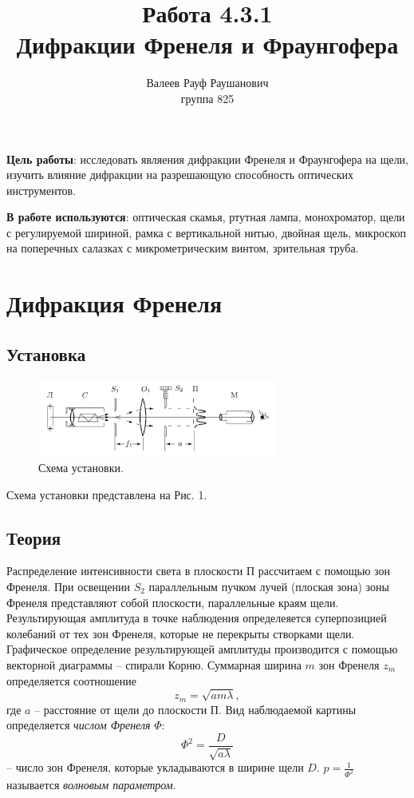 \documentclass[a4paper, 12pt]{article}%
\author{Валеев Рауф Раушанович \\
группа 825}
\date{}
\title{\textbf{Работа 4.3.1\\Дифракции Френеля и Фраунгофера}}
\begin{document}
\maketitle
\textbf{Цель работы}: исследовать являения дифракции Френеля и Фраунгофера на щели, изучить влияние дифракции на разрешающую способность оптических инструментов.


\textbf{В работе используются}: оптическая скамья, ртутная лампа, монохроматор, щели с регулируемой шириной, рамка с вертикальной нитью, двойная щель, микроскоп на поперечных салазках с микрометрическим винтом, зрительная труба.
\section{Дифракция Френеля}
\subsection*{Установка}
\begin{figure}[h]
\includegraphics[width=0.7\textwidth]{7.jpg}
\centering
\caption{Схема установки.}
\end{figure}
Схема установки представлена на Рис. 1.\\
\subsection*{Теория}
Распределение интенсивности света в плоскости П рассчитаем с помощью зон Френеля. При освещении $S_2$ параллельным пучком лучей (плоская зона) зоны Френеля представляют собой плоскости, параллельные краям щели. Результирующая амплитуда в точке наблюдения определеяется суперпозицией колебаний от тех зон Френеля, которые не перекрыты створками щели. Графическое определение результирующей амплитуды производится с помощью векторной диаграммы -- спирали Корню. Суммарная ширина $m$ зон Френеля $z_m$ определяется соотношение
\begin{equation}
z_m = \sqrt{am\lambda},
\end{equation}
где $a$ -- расстояние от щели до плоскости П. Вид наблюдаемой картины определяется \textit{числом Френеля} $\Phi$:
$$
\Phi^2 = \dfrac{D}{\sqrt{a\lambda}}
$$
-- число зон Френеля, которые укладываются в ширине щели $D$. $p = \frac{1}{\Phi^2}$ называется \textit{волновым параметром}. 
\end{document}
